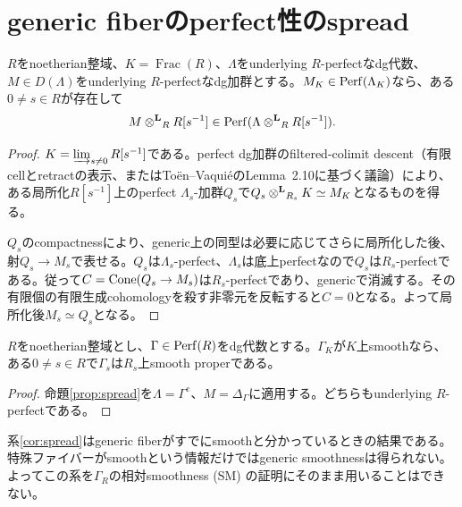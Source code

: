 \section{generic fiberのperfect性のspread}
\begin{proposition}[genericなperfectnessの局所化]\label{prop:spread}
$R$をnoetherian整域、$K=\operatorname{Frac}(R)$、$\Lambda$をunderlying $R$-perfectなdg代数、$M\in D(\Lambda)$をunderlying $R$-perfectなdg加群とする。$M_K\in\operatorname{Perf}(\Lambda_K)$なら、ある$0\neq s\in R$が存在して
\[
 M\mathbin{\otimes^{\mathbf L}}_RR[s^{-1}]\in\operatorname{Perf}(\Lambda\mathbin{\otimes^{\mathbf L}}_RR[s^{-1}]).
\]
\end{proposition}
\begin{proof}
$K=\varinjlim_{s\neq0}R[s^{-1}]$である。perfect dg加群のfiltered-colimit descent（有限cellとretractの表示、またはToën--VaquiéのLemma~2.10に基づく議論）により、ある局所化$R[s^{-1}]$上のperfect $\Lambda_s$-加群$Q_s$で$Q_s\mathbin{\otimes^{\mathbf L}}_{R_s}K\simeq M_K$となるものを得る。

$Q_s$のcompactnessにより、generic上の同型は必要に応じてさらに局所化した後、射$Q_s\to M_s$で表せる。$Q_s$は$\Lambda_s$-perfect、$\Lambda_s$は底上perfectなので$Q_s$は$R_s$-perfectである。従って$C=\operatorname{Cone}(Q_s\to M_s)$は$R_s$-perfectであり、genericで消滅する。その有限個の有限生成cohomologyを殺す非零元を反転すると$C=0$となる。よって局所化後$M_s\simeq Q_s$となる。
\end{proof}

\begin{corollary}\label{cor:spread}
$R$をnoetherian整域とし、$\Gamma\in\operatorname{Perf}(R)$をdg代数とする。$\Gamma_K$が$K$上smoothなら、ある$0\neq s\in R$で$\Gamma_s$は$R_s$上smooth properである。
\end{corollary}
\begin{proof}
命題\ref{prop:spread}を$\Lambda=\Gamma^e$、$M=\Delta_\Gamma$に適用する。どちらもunderlying $R$-perfectである。
\end{proof}

\begin{remark}[何を証明していないか]\label{rem:not-open}
系\ref{cor:spread}はgeneric fiberがすでにsmoothと分かっているときの結果である。特殊ファイバーがsmoothという情報だけではgeneric smoothnessは得られない。よってこの系を$\Gamma_R$の相対smoothness (SM) の証明にそのまま用いることはできない。
\end{remark}

